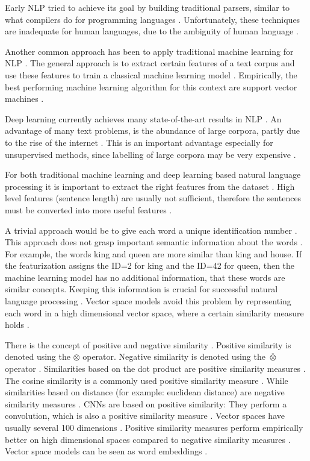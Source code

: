 \documentclass[draft,final,oneside]{vutinfth} %
\begin{document}
Early NLP tried to achieve its goal by building traditional parsers, similar to what compilers do for programming languages \cite{speechandlanguageprocessing}. Unfortunately, these techniques are inadequate for human languages, due to the ambiguity of human language \cite{statisticalnlp}.

Another common approach has been to apply traditional machine learning for NLP \cite{statisticalnlp}. The general approach is to extract certain features of a text corpus and use these features to train a classical machine learning model \cite{svmnlp}. Empirically, the best performing machine learning algorithm for this context are support vector machines \cite{svmnlp}.

Deep learning currently achieves many state-of-the-art results in NLP \cite{nmt}\cite{paraphrase}. An advantage of many text problems, is the abundance of large corpora, partly due to the rise of the internet \cite{bert}. This is an important advantage especially for unsupervised methods, since labelling of large corpora may be very expensive \cite{elmo}\cite{bert}.

For both traditional machine learning and deep learning based natural language processing it is important to extract the right features from the dataset \cite{statisticalnlp}. High level features (sentence length) are usually not sufficient, therefore the sentences must be converted into more useful features \cite{Yang2015HumorRA}.

A trivial approach would be to give each word a unique identification number \cite{deeplearningnlpstanford}. This approach does not grasp important semantic information about the words \cite{deeplearningnlpstanford}. For example, the words king and queen are more similar than king and house. If the featurization assigns the ID=2 for king and the ID=42 for queen, then the machine learning model has no additional information, that these words are similar concepts. Keeping this information is crucial for successful natural language processing \cite{nmt}\cite{elmo}. Vector space models avoid this problem by representing each word in a high dimensional vector space, where a certain similarity measure holds \cite{pennington2014glove}.

There is the concept of positive and negative similarity \cite{TUW-233295}. Positive similarity is denoted using the $\otimes$ operator. Negative similarity is denoted using the $\overline{\otimes}$ operator \cite{TUW-233295}. Similarities based on the dot product are positive similarity measures \cite{TUW-233295}. The cosine similarity is a commonly used positive similarity measure \cite{modernir}. While similarities based on distance (for example: euclidean distance) are negative similarity measures \cite{TUW-233295}. CNNs are based on positive similarity: They perform a convolution, which is also a positive similarity measure \cite{alexnet}. Vector spaces have usually several 100 dimensions \cite{bert}. Positive similarity measures perform empirically better on high dimensional spaces compared to negative similarity measures \cite{surprisinghighdimensional}. Vector space models can be seen as word embeddings \cite{elmo}.
\end{document}
